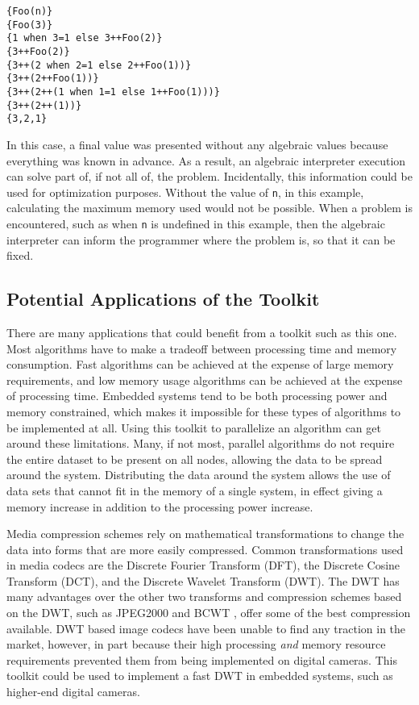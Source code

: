 \begin{lstlisting}
{Foo(n)}
{Foo(3)}
{1 when 3=1 else 3++Foo(2)}
{3++Foo(2)}
{3++(2 when 2=1 else 2++Foo(1))}
{3++(2++Foo(1))}
{3++(2++(1 when 1=1 else 1++Foo(1)))}
{3++(2++(1))}
{3,2,1}
\end{lstlisting}
In this case, a final value was presented without any algebraic values because everything was known in advance. As a result, an algebraic interpreter execution can solve part of, if not all of, the problem. Incidentally, this information could be used for optimization purposes. Without the value of \lstinline$n$, in this example, calculating the maximum memory used would not be possible. When a problem is encountered, such as when \lstinline$n$ is undefined in this example, then the algebraic interpreter can inform the programmer where the problem is, so that it can be fixed. 

\subsection{Potential Applications of the Toolkit}\label{sec:conclusions:future_work:toolkit_applications}

There are many applications that could benefit from a toolkit such as this one. Most algorithms have to make a tradeoff between processing time and memory consumption. Fast algorithms can be achieved at the expense of large memory requirements, and low memory usage algorithms can be achieved at the expense of processing time. Embedded systems tend to be both processing power and memory constrained, which makes it impossible for these types of algorithms to be implemented at all. Using this toolkit to parallelize an algorithm can get around these limitations. Many, if not most, parallel algorithms do not require the entire dataset to be present on all nodes, allowing the data to be spread around the system. Distributing the data around the system allows the use of data sets that cannot fit in the memory of a single system, in effect giving a memory increase in addition to the processing power increase.

Media compression schemes rely on mathematical transformations to change the data into forms that are more easily compressed. Common transformations used in media codecs are the Discrete Fourier Transform (DFT), the Discrete Cosine Transform (DCT), and the Discrete Wavelet Transform (DWT). The DWT has many advantages over the other two transforms and compression schemes based on the DWT, such as JPEG2000 \cite{ref:2001-taubman-jpeg2000} and BCWT \cite{ref:2006-guo-bcwt}, offer some of the best compression available. DWT based image codecs have been unable to find any traction in the market, however, in part because their high processing \emph{and} memory resource requirements prevented them from being implemented on digital cameras. This toolkit could be used to implement a fast DWT in embedded systems, such as higher-end digital cameras.

